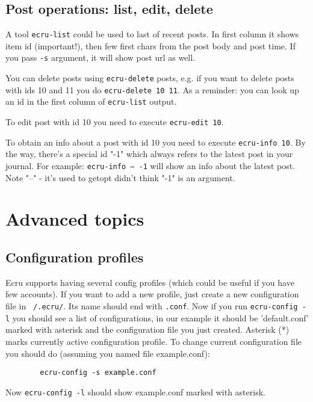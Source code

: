 \documentclass{article}
\begin{document}
	\subsection{Post operations: list, edit, delete}
	A tool {\tt ecru-list} could be used to last of recent posts. In first column it shows item id (important!),
	then few first chars from the post body and post time. If you pass {\tt -s} argument, it will show post url
	as well.

	You can delete posts using {\tt ecru-delete} posts, e.g. if you want to delete posts with ids 10 and 11 you
	do {\tt ecru-delete 10 11}. As a reminder: you can look up an id in the first column of {\tt ecru-list} 
	output.

	To edit post with id 10 you need to execute {\tt ecru-edit 10}. 

	To obtain an info about a post with id 10 you need to execute {\tt ecru-info 10}. By the way, there's a special
	id "-1" which always refers to the latest post in your journal. For example: {\tt ecru-info -- -1} will
	show an info about the latest post. Note "--" - it's used to getopt didn't think "-1" is an argument.
     \section{Advanced topics}
       \subsection{Configuration profiles}
	Ecru supports having several config profiles (which could be useful if you have few accounts). If you want to
	add a new profile, just create a new configuration file in {\tt ~/.ecru/}. Its name should end with
	{\tt .conf}. 
	Now if you run {\tt ecru-config -l} you should see a list of configurations, in our example it should be
	'default.conf' marked with asterisk and the configuration file you just created. Asterisk (*) marks
	currently active configuration profile. To change current configuration file you should do (assuming
	you named file example.conf): 
	\begin{verbatim}
		ecru-config -s example.conf
	\end{verbatim}

	Now {\tt ecru-config -l} should show example.conf marked with asterisk.
\end{document}
